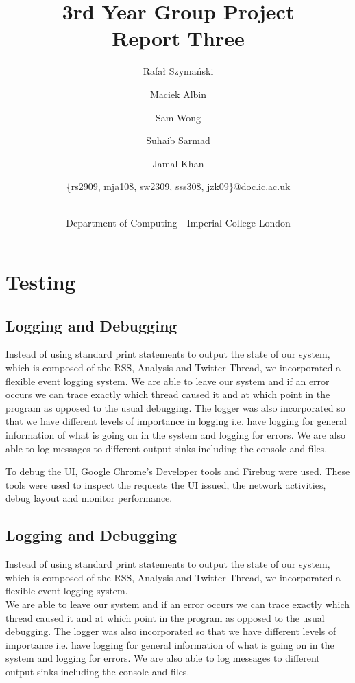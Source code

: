 \documentclass[a4paper,12pt]{article}
\title{3rd Year Group Project\\Report Three\\}
\author{
    \small{Rafał Szymański}\\
  	\and
    \small{Maciek Albin}\\
    \and
    \small{Sam Wong}\\
    \and  
    \small{Suhaib Sarmad}\\
		\and
		\small{Jamal Khan}\\
		\and
		\small{\{rs2909, mja108, sw2309, sss308, jzk09\}@doc.ic.ac.uk}
		\and
		\\Department of Computing - Imperial College London
}
\date{}
\begin{document}
 
	\maketitle
	
	\section{Testing}
		\subsection{Logging and Debugging}

		  Instead of using standard print statements to output the state of our system, which is composed of the RSS, Analysis and Twitter Thread, we incorporated a flexible event logging system.
		We are able to leave our system and if an error occurs we can trace exactly which thread caused it and at which point in the program as opposed to the usual debugging.
	  The logger was also incorporated so that we have different levels of importance in logging i.e. have logging for general information of what is going on in the system and logging for errors. We are also able to log messages to different output sinks including the console and files.

		To debug the UI, Google Chrome’s Developer tools and Firebug were used. These tools were used to inspect the requests the UI issued, the network activities, debug layout and monitor performance.

	
	
	  \subsection{Logging and Debugging}
	
	  Instead of using standard print statements to output the state of our system, which is composed of the RSS, Analysis and Twitter Thread, we incorporated a flexible event logging system.\\
	We are able to leave our system and if an error occurs we can trace exactly which thread caused it and at which point in the program as opposed to the usual debugging.
  The logger was also incorporated so that we have different levels of importance i.e. have logging for general information of what is going on in the system and logging for errors. We are also able to log messages to different output sinks including the console and files.
	
\end{document}
